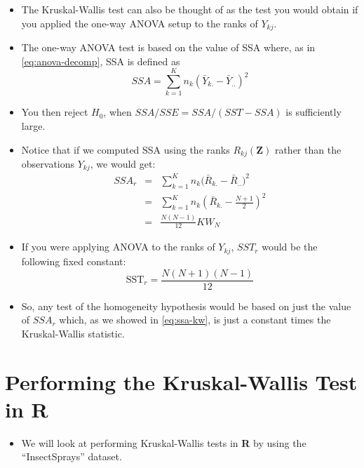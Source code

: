 \documentclass[]{book}
\providecommand{\tightlist}{%
  \setlength{\itemsep}{0pt}\setlength{\parskip}{0pt}}
\begin{document}
\begin{itemize}
\item
  The Kruskal-Wallis test can also be thought of as the test you would obtain
  if you applied the one-way ANOVA setup to the ranks of \(Y_{kj}\).
\item
  The one-way ANOVA test is based on the value of SSA where, as in \eqref{eq:anova-decomp},
  SSA is defined as
  \begin{equation}
  SSA = \sum_{k=1}^{K} n_{k} (\bar{Y}_{k.} - \bar{Y}_{..})^{2} \nonumber
  \end{equation}
\item
  You then reject \(H_{0}\), when \(SSA/SSE = SSA/(SST - SSA)\) is sufficiently large.
\item
  Notice that if we computed SSA using the ranks \(R_{kj}( \mathbf{Z} )\)
  rather than the observations \(Y_{kj}\), we would get:
  \begin{eqnarray}
  SSA_{r} &=& \sum_{k=1}^{K} n_{k} \Big( \bar{R}_{k.} - \bar{R}_{..} \Big)^{2}  \nonumber \\
  &=& \sum_{k=1}^{K} n_{k} (\bar{R}_{k.} - \frac{N+1}{2})^{2}  \nonumber \\
  &=& \frac{N(N-1)}{12} KW_{N}  
  \label{eq:ssa-kw}
  \end{eqnarray}
\item
  If you were applying ANOVA to the ranks of \(Y_{kj}\), \(SST_{r}\) would be
  the following fixed constant:
  \begin{equation}
  \textrm{SST}_{r} = \frac{N(N + 1)(N-1)}{12} \nonumber
  \end{equation}
\item
  So, any test of the homogeneity hypothesis would
  be based on just the value of \(SSA_{r}\) which, as we showed in \eqref{eq:ssa-kw},
  is just a constant times the Kruskal-Wallis statistic.
\end{itemize}

\hypertarget{performing-the-kruskal-wallis-test-in-r}{%
\section{Performing the Kruskal-Wallis Test in R}\label{performing-the-kruskal-wallis-test-in-r}}

\begin{itemize}
\tightlist
\item
  We will look at performing Kruskal-Wallis tests in \textbf{R} by using the
  ``InsectSprays'' dataset.
\end{itemize}
\end{document}
